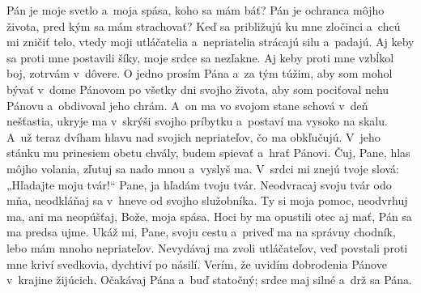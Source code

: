Pán je moje svetlo a~moja spása, koho sa mám báť?
\versseparator
Pán je ochranca môjho života, pred kým sa mám strachovať?
\versseparator
Keď sa približujú ku mne zločinci
a~chcú mi zničiť telo,
\versseparator
vtedy moji utláčatelia a~nepriatelia
strácajú silu a~padajú.
\versseparator
Aj keby sa proti mne postavili šíky,
moje srdce sa nezľakne.
\versseparator
Aj keby proti mne vzbĺkol boj,
zotrvám v~dôvere.
\versseparator
O jedno prosím Pána a~za tým túžim,
aby som mohol bývať v~dome Pánovom
po všetky dni svojho života,
\versseparator
aby som pociťoval nehu Pánovu
a~obdivoval jeho chrám.
\versseparator
A~on ma vo svojom stane schová
v~deň nešťastia, ukryje ma v~skrýši svojho príbytku
\versseparator
a~postaví ma vysoko na skalu.
A~už teraz dvíham hlavu
nad svojich nepriateľov, čo ma obkľučujú.
\versseparator
V~jeho stánku mu prinesiem obetu chvály,
budem spievať a~hrať Pánovi.
\versseparator
Čuj, Pane, hlas môjho volania,
zľutuj sa nado mnou a~vyslyš ma.
\versseparator
V~srdci mi znejú tvoje slová: „Hľadajte moju tvár!“
Pane, ja hľadám tvoju tvár.
\versseparator
Neodvracaj svoju tvár odo mňa,
neodkláňaj sa v~hneve od svojho služobníka.
\versseparator
Ty si moja pomoc, neodvrhuj ma,
ani ma neopúšťaj, Bože, moja spása.
\versseparator
Hoci by ma opustili otec aj mať,
Pán sa ma predsa ujme.
\versseparator
Ukáž mi, Pane, svoju cestu
a~priveď ma na správny chodník, lebo mám mnoho nepriateľov.
\versseparator
Nevydávaj ma zvoli utláčateľov,
veď povstali proti mne kriví svedkovia,
dychtiví po násilí.
\versseparator
Verím, že uvidím dobrodenia Pánove v~krajine žijúcich.
\versseparator
Očakávaj Pána a~buď statočný;
srdce maj silné a~drž sa Pána. 
